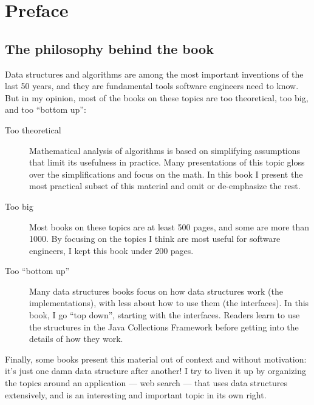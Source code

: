 \documentclass[12pt]{book}
\theoremstyle{exercise}
\begin{document}

\fi


\chapter*{Preface}
\label{preface}



\section*{The philosophy behind the book}

Data structures and algorithms are among the most important inventions
of the last 50 years, and they are fundamental tools software
engineers need to know.  But in my opinion, most of the books on these
topics are too theoretical, too big, and too ``bottom up'':

\begin{description}

\item[Too theoretical]  Mathematical analysis of algorithms is based
on simplifying assumptions that limit its usefulness in practice.
Many presentations of this topic gloss over the simplifications and
focus on the math.  In this book I present the most practical subset
of this material and omit or de-emphasize the rest.

\item[Too big] Most books on these topics are at least 500 pages,
and some are more than 1000.  By focusing on the topics I think are
most useful for software engineers, I kept this book under
200 pages.

\item[Too ``bottom up''] Many data structures books focus on how data
  structures work (the implementations), with less about how to use
  them (the interfaces).  In this book, I go ``top down'', starting
  with the interfaces.  Readers learn to use the structures in the
  Java Collections Framework before getting into the details of how
  they work.

\end{description}

Finally, some books present this material out of context and without
motivation: it's just one damn data structure after another!
I try to liven it up by organizing the topics around an
application --- web search --- that uses data structures extensively,
and is an interesting and important topic in its own right.
\end{document}
